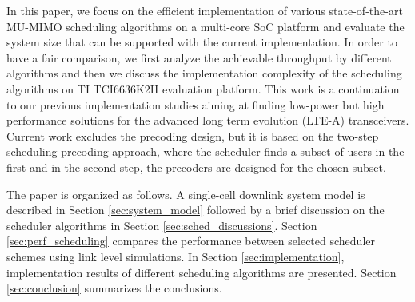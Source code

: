 \documentclass[conference,letterpaper]{./../../IEEE/IEEEtran}
\begin{document}
In this paper, we focus on the efficient implementation of various state-of-the-art MU-MIMO scheduling algorithms on a multi-core \ac{SoC} platform and evaluate the system size that can be supported with the current implementation. In order to have a fair comparison, we first analyze the achievable throughput by different algorithms and then we discuss the implementation complexity of the scheduling algorithms on TI TCI6636K2H evaluation platform. This work is a continuation to our previous implementation studies \cite{Janhunen-etal-11, Hanninen-etal-2014, Shahabuddin-etal-2014} aiming at finding low-power but high performance solutions for the advanced long term evolution (LTE-A) transceivers. Current work excludes the precoding design, but it is based on the two-step scheduling-precoding approach, where the scheduler finds a subset of users in the first and in the second step, the precoders are designed for the chosen subset.

The paper is organized as follows. A single-cell downlink system model is described in Section \ref{sec:system_model} followed by a brief discussion on the scheduler algorithms in Section \ref{sec:sched_discussions}. Section \ref{sec:perf_scheduling} compares the performance between selected scheduler schemes using link level simulations. In Section \ref{sec:implementation}, implementation results of different scheduling algorithms are presented. Section \ref{sec:conclusion} summarizes the conclusions.
\end{document}
